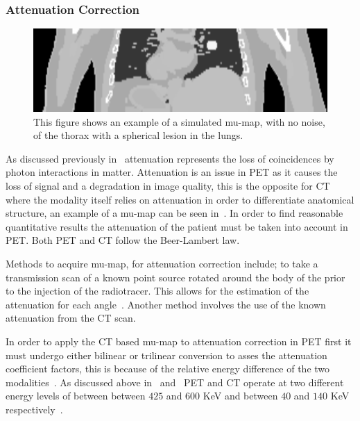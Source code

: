            \subsubsection{Attenuation Correction} \label{sec:attenuation_correction}
                \begin{figure}
                    \centering
                    
                    \includegraphics[width=1.0\linewidth]{figures/background_mu_map_example.png}
                    
                    \captionsetup{singlelinecheck=false, justification=raggedright}
                    \caption{This figure shows an example of a simulated \gls{mu-map}, with no noise, of the thorax with a spherical lesion in the lungs.} \label{fig:combined_pet_ct_mu_map_example}
                \end{figure}
                
                As discussed previously in~ attenuation represents the loss of coincidences by photon interactions in matter. Attenuation is an issue in \gls{PET} as it causes the loss of signal and a degradation in image quality, this is the opposite for \gls{CT} where the modality itself relies on attenuation in order to differentiate anatomical structure, an example of a \gls{mu-map} can be seen in~. In order to find reasonable quantitative results the attenuation of the patient must be taken into account in \gls{PET}. Both \gls{PET} and \gls{CT} follow the Beer-Lambert law.
                
                Methods to acquire \gls{mu-map}, for attenuation correction include; to take a transmission scan of a known point source rotated around the body of the  prior to the injection of the radiotracer. This allows for the estimation of the attenuation for each angle~. Another method involves the use of the known attenuation from the \gls{CT} scan.
                
                In order to apply the \gls{CT} based \gls{mu-map} to attenuation correction in \gls{PET} first it must undergo either bilinear or trilinear conversion to asses the attenuation coefficient factors, this is because of the relative energy difference of the two modalities~. As discussed above in~ and~ \gls{PET} and \gls{CT} operate at two different energy levels of between between $425$ and $600$ \gls{KeV} and between $40$ and $140$ \gls{KeV} respectively~.
                
